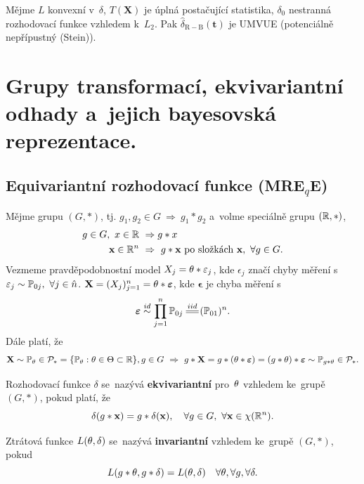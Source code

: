 \begin{theorem}
	Mějme $L$ konvexní v~$\delta$, $T(\textbf{X})$ je úplná postačující statistika, $\delta_0$ nestranná rozhodovací funkce vzhledem k~$L_2$. Pak $\widehat{\delta}_\mathrm{R-B}(\textbf{t})$ je UMVUE (potenciálně nepřípustný (Stein)).
	

\end{theorem}

\chapter{Grupy transformací, ekvivariantní odhady a~jejich bayesovská reprezentace.}

\section{Equivariantní rozhodovací funkce (MRE$_q$E)}
\begin{define}
	Mějme grupu $(G,\ast)$, tj. $g_1,g_2\in G~\Rightarrow~ g_1\ast g_2$ a~volme speciálně grupu $(\mathbb{R},\ast)$, \[
	\begin{split}
	g\in G,~x\in \mathbb{R}&~\Rightarrow g\ast x \\ \textbf{x}\in\mathbb{R}^n&~\Rightarrow~ g\ast \textbf{x}\text{ po~složkách }\textbf{x},~\forall g\in G.
	\end{split}
	\]
	Vezmeme pravděpodobnostní model $X_j=\theta\ast \varepsilon_j$, kde $\epsilon_j$ značí chyby měření s~$\varepsilon_j\sim \mathbb{P}_{0j},~\forall j\in\hat{n}$. $\textbf{X}=(X_j)_{j=1}^n=\theta\ast\boldsymbol{\varepsilon}$, kde $\boldsymbol{\epsilon}$ je chyba měření s~$$\boldsymbol{\epsilon}\stackrel{id}{\sim}\prod_{j=1}^n \PP_{0j}\equal{iid}(\PP_{01})^n.$$
	Dále platí, že $$ \textbf{X}\sim \mathbb{P}_\theta\in\mathcal{P}_\ast=\{\mathbb{P}_\theta:\theta\in\Theta\subset \mathbb{R}\}, g\in G~\Rightarrow~ g\ast \textbf{X}=g\ast(\theta\ast\boldsymbol{\varepsilon})=(g\ast\theta)\ast\boldsymbol{\varepsilon}\sim \mathbb{P}_{g\ast \theta}\in \mathcal{P}_\ast.$$ 
\end{define}
\begin{define}
	Rozhodovací funkce $\delta$ se~nazývá \textbf{ekvivariantní} pro~$\theta$ vzhledem ke~grupě $(G,\ast)$, pokud platí, že $$ \delta(g\ast\textbf{x})=g\ast \delta(\textbf{x}),\quad \forall g\in G,~\forall \textbf{x}\in\chi(\mathbb{R}^n).$$
\end{define}
\begin{define}
	Ztrátová funkce $L(\theta,\delta)$ se~nazývá \textbf{invariantní} vzhledem ke~grupě $(G,\ast)$, pokud $$ L(g\ast\theta,g\ast\delta)=L(\theta,\delta)\quad\forall \theta,\forall g,\forall \delta.$$
\end{define}
